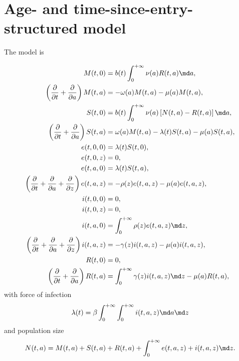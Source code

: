 \documentclass{jpmarticle}
\let\subequationsorig\subequations%
\let\endsubequationsorig\endsubequations%
\renewenvironment{subequations}{
  \subequationsorig
  \renewcommand{\theequation}{\theparentequation.\arabic{equation}}
}{
  \endsubequationsorig
}
\begin{document}
\section{Age- and time-since-entry-structured model}

The model is
\begin{subequations}
  \label{model_age_and_time_since_entry_structured}
  \begin{align}
    M(t, 0) &=
    b(t) \int_0^{+\infty} \nu(a) R(t, a) \md a,
    \\
    \left(\frac{\partial}{\partial t}
      + \frac{\partial}{\partial a}\right)
    M(t, a) &=
    - \omega(a) M(t, a) - \mu(a) M(t, a),
    \\
    S(t, 0) &=
    b(t) \int_0^{+\infty} \nu(a) \left[N(t, a) - R(t, a)\right] \md a,
    \\
    \left(\frac{\partial}{\partial t}
      + \frac{\partial}{\partial a}\right)
    S(t, a) &=
    \omega(a) M(t, a) - \lambda(t) S(t, a) - \mu(a) S(t, a),
    \\
    e(t, 0, 0) &=
    \lambda(t) S(t, 0),
    \\
    e(t, 0, z) &=
    0,
    \\
    e(t, a, 0) &=
    \lambda(t) S(t, a),
    \\
    \left(\frac{\partial}{\partial t}
      + \frac{\partial}{\partial a}
      + \frac{\partial}{\partial z}\right)
    e(t, a, z) &=
    - \rho(z) e(t, a, z) - \mu(a) e(t, a, z),
    \\
    i(t, 0, 0) &=
    0,
    \\
    i(t, 0, z) &=
    0,
    \\
    i(t, a, 0) &=
    \int_0^{+\infty} \rho(z) e(t, a, z) \md z,
    \\
    \left(\frac{\partial}{\partial t}
      + \frac{\partial}{\partial a}
      + \frac{\partial}{\partial z}\right)
    i(t, a, z) &=
    - \gamma(z) i(t, a, z) - \mu(a) i(t, a, z),
    \\
    R(t, 0) &=
    0,
    \\
    \left(\frac{\partial}{\partial t}
      + \frac{\partial}{\partial a}\right)
    R(t, a) &=
    \int_0^{+\infty} \gamma(z) i(t, a, z) \md z
    - \mu(a) R(t, a),
  \end{align}
  with force of infection
  \begin{equation}
    \lambda(t) =
    \beta
    \int_0^{+\infty} \int_0^{+\infty}
    i(t, a, z)
    \md a \md z
  \end{equation}
  and population size
  \begin{equation}
    N(t, a) =
    M(t, a) + S(t, a) + R(t, a)
    + \int_0^{+\infty} e(t, a, z) + i(t, a, z) \md z.
  \end{equation}
\end{subequations}
\end{document}
